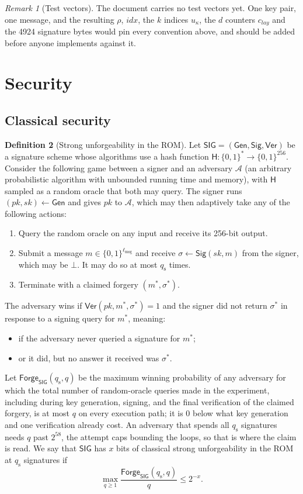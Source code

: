\documentclass[11pt]{article}
\theoremstyle{definition}
\newtheorem{definition}{Definition}[section]
\theoremstyle{plain}
\theoremstyle{remark}
\newtheorem{remark}[definition]{Remark}
\newcommand{\bits}[1]{\{0,1\}^{#1}}
\newcommand{\Gen}{\mathsf{Gen}}
\newcommand{\Sig}{\mathsf{Sig}}
\newcommand{\Ver}{\mathsf{Ver}}
\newcommand{\SIG}{\mathsf{SIG}}
\newcommand{\Forge}{\mathsf{Forge}}
\newcommand{\hash}{\mathsf{H}}
\newcommand{\sk}{\mathit{sk}}
\newcommand{\pk}{\mathit{pk}}
\newcommand{\lmsg}{\ell_{\mathrm{msg}}}
\newcommand{\qs}{q_{\mathrm{s}}}
\newcommand{\idx}{\mathit{idx}}
\newcommand{\lay}{\mathit{lay}}
\begin{document}
\begin{remark}[Test vectors]
The document carries no test vectors yet. One key pair, one message, and the resulting $\rho$, $\idx$, the $k$ indices $u_\kappa$, the $d$ counters $c_\lay$ and the 4924 signature bytes would pin every convention above, and should be added before anyone implements against it.
\end{remark}

\section{Security}
\label{sec:security}

\subsection{Classical security}

\begin{definition}[Strong unforgeability in the ROM]
Let $\SIG=(\Gen,\Sig,\Ver)$ be a signature scheme whose algorithms use a hash function $\hash:\bits{*}\to\bits{256}$. Consider the following game between a signer and an adversary $\mathcal A$ (an arbitrary probabilistic algorithm with unbounded running time and memory), with $\hash$ sampled as a random oracle that both may query. The signer runs $(\pk,\sk)\gets\Gen$ and gives $\pk$ to $\mathcal A$, which may then adaptively take any of the following actions:
\begin{enumerate}[leftmargin=2em]
  \item Query the random oracle on any input and receive its 256-bit output.
  \item Submit a message $m\in\bits{\lmsg}$ and receive $\sigma\gets\Sig(\sk,m)$ from the signer, which may be $\bot$. It may do so at most $\qs$ times.
  \item Terminate with a claimed forgery $(m^*,\sigma^*)$.
\end{enumerate}
The adversary wins if $\Ver(\pk,m^*,\sigma^*)=1$ and the signer did not return $\sigma^*$ in response to a signing query for $m^*$, meaning:
\begin{itemize}[leftmargin=2em]
  \item if the adversary never queried a signature for $m^*$;
  \item or it did, but no answer it received was $\sigma^*$.
\end{itemize}
Let $\Forge_{\SIG}(\qs,q)$ be the maximum winning probability of any adversary for which the total number of random-oracle queries made in the experiment, including during key generation, signing, and the final verification of the claimed forgery, is at most $q$ on every execution path; it is $0$ below what key generation and one verification already cost. An adversary that spends all $\qs$ signatures needs $q$ past $2^{58}$, the attempt caps bounding the loops, so that is where the claim is read. We say that $\SIG$ has $x$ bits of classical strong unforgeability in the ROM at $\qs$ signatures if
\[
  \max_{q\geq1}\frac{\Forge_{\SIG}(\qs,q)}{q}\leq 2^{-x}.
\]
\end{definition}
\end{document}
